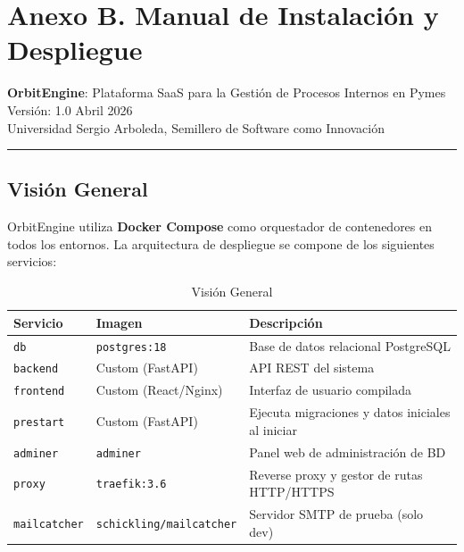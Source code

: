 \chapter{Anexo B. Manual de Instalación y Despliegue}\label{anexo-b.-manual-de-instalaciuxf3n-y-despliegue}

\textbf{OrbitEngine}: Plataforma SaaS para la Gestión de Procesos Internos en Pymes\\
Versión: 1.0 \textbar{} Abril 2026\\
Universidad Sergio Arboleda, Semillero de Software como Innovación

\begin{center}\rule{0.5\linewidth}{0.5pt}\end{center}

\section{Visión General}\label{visiuxf3n-general}

OrbitEngine utiliza \textbf{Docker Compose} como orquestador de contenedores en todos los entornos. La arquitectura de despliegue se compone de los siguientes servicios:

\begin{longtable}[]{@{}
  >{\raggedright\arraybackslash}p{}
  >{\raggedright\arraybackslash}p{}
  >{\raggedright\arraybackslash}p{}@{}}
\caption[Visión General]{Visión General}\tabularnewline
\toprule\noalign{}
\begin{minipage}[b]{\linewidth}\raggedright
Servicio
\end{minipage} & \begin{minipage}[b]{\linewidth}\raggedright
Imagen
\end{minipage} & \begin{minipage}[b]{\linewidth}\raggedright
Descripción
\end{minipage} \\
\midrule\noalign{}
\endhead
\bottomrule\noalign{}
\endlastfoot
\texttt{db} & \texttt{postgres:18} & Base de datos relacional PostgreSQL \\
\texttt{backend} & Custom (FastAPI) & API REST del sistema \\
\texttt{frontend} & Custom (React/Nginx) & Interfaz de usuario compilada \\
\texttt{prestart} & Custom (FastAPI) & Ejecuta migraciones y datos iniciales al iniciar \\
\texttt{adminer} & \texttt{adminer} & Panel web de administración de BD \\
\texttt{proxy} & \texttt{traefik:3.6} & Reverse proxy y gestor de rutas HTTP/HTTPS \\
\texttt{mailcatcher} & \texttt{schickling/mailcatcher} & Servidor SMTP de prueba (solo dev) \\
\end{longtable}

